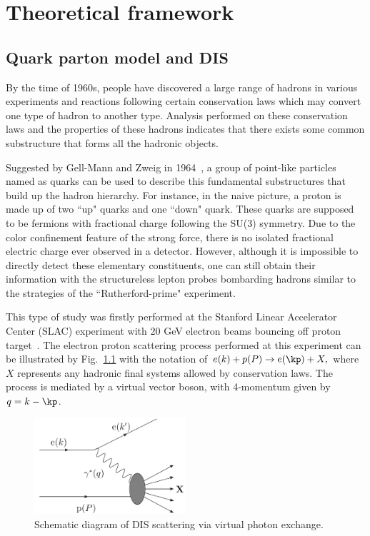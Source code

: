 \chapter{Theoretical framework}
\label{chp:theory}

\section{Quark parton model and DIS}
\label{sec:basicDIS}
By the time of 1960s, people have discovered a large range of hadrons 
in various experiments and reactions following certain conservation laws
which may convert one type of hadron to another type. Analysis performed on these 
conservation laws and the properties of these hadrons indicates that
there exists some common substructure that forms all the hadronic objects.


Suggested by Gell-Mann and Zweig in 1964~\cite{Gell:1964}, a group of point-like particles named
as quarks can be used to describe this fundamental substructures that build up
the hadron hierarchy. For instance, in the naive picture, a proton is made up of
two ``up" quarks and one ``down" quark. These quarks are supposed to be fermions
with fractional charge following the SU(3) symmetry. Due to the color confinement
feature of the strong force, there is no isolated fractional electric charge ever
observed in a detector. However, although it is impossible to directly detect these
elementary constituents, one can still obtain their information with the
structureless lepton probes bombarding hadrons similar to the strategies of the
``Rutherford-prime" experiment.

This type of study was firstly performed at the Stanford Linear Accelerator
Center (SLAC) experiment with 20 GeV electron beams bouncing off proton
target~\cite{Panofsky:1966gq}. The electron proton scattering process performed
at this experiment can be illustrated by Fig.~\ref{fig:DIS_kinematics} with the
notation of \( e(k)+p(P) \rightarrow e(\kp) + X, \) where $X$ represents any
hadronic final systems allowed by conservation laws. The process is mediated by
a virtual vector boson, with 4-momentum given by $q=k-\kp$.

\begin{figure}
\centering
\includegraphics[width=0.5\textwidth]{plots/chpt2/DIS_kinematics.png} 
\caption[The schematic diagram of a DIS process] {
Schematic diagram of DIS scattering via virtual photon exchange.}
\label{fig:DIS_kinematics}
\end{figure}

